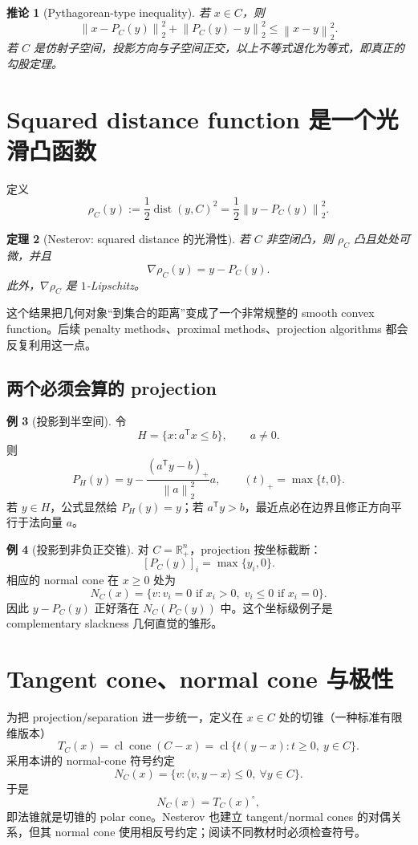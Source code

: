 \documentclass[11pt,a4paper,openany]{ctexrep}
\newtheorem{theorem}{定理}[chapter]
\newtheorem{corollary}[theorem]{推论}
\theoremstyle{definition}
\newtheorem{example}[theorem]{例}
\newcommand{\R}{\mathbb{R}}
\newcommand{\cl}{\operatorname{cl}}
\newcommand{\cone}{\operatorname{cone}}
\newcommand{\dist}{\operatorname{dist}}
\newcommand{\inner}[2]{\langle #1,#2\rangle}
\newcommand{\norm}[1]{\left\lVert #1\right\rVert}
\newcommand{\transpose}{\mathsf{T}}
\begin{document}
\begin{corollary}[Pythagorean-type inequality]
若 $x\in C$，则
\[
\norm{x-P_C(y)}_2^2+\norm{P_C(y)-y}_2^2
\le \norm{x-y}_2^2.
\]
若 $C$ 是仿射子空间，投影方向与子空间正交，以上不等式退化为等式，即真正的勾股定理。
\end{corollary}

\section{Squared distance function 是一个光滑凸函数}
定义
\[
\rho_C(y):=\frac12\dist(y,C)^2
=\frac12\norm{y-P_C(y)}_2^2.
\]

\begin{theorem}[Nesterov: squared distance 的光滑性]
若 $C$ 非空闭凸，则 $\rho_C$ 凸且处处可微，并且
\[
\nabla \rho_C(y)=y-P_C(y).
\]
此外，$\nabla\rho_C$ 是 $1$-Lipschitz。
\end{theorem}
这个结果把几何对象“到集合的距离”变成了一个非常规整的 smooth convex function。后续 penalty methods、proximal methods、projection algorithms 都会反复利用这一点。\cite[\S2.2.3, Lem.~2.2.9]{nesterov}


\subsection{两个必须会算的 projection}
\begin{example}[投影到半空间]
令
\[
H=\{x:a^\transpose x\le b\},\qquad a\ne0.
\]
则
\[
P_H(y)=y-\frac{(a^\transpose y-b)_+}{\norm a_2^2}a,
\qquad (t)_+=\max\{t,0\}.
\]
若 $y\in H$，公式显然给 $P_H(y)=y$；若 $a^\transpose y>b$，最近点必在边界且修正方向平行于法向量 $a$。
\end{example}

\begin{example}[投影到非负正交锥]
对 $C=\R_+^n$，projection 按坐标截断：
\[
[P_C(y)]_i=\max\{y_i,0\}.
\]
相应的 normal cone 在 $x\ge0$ 处为
\[
N_C(x)=\{v: v_i=0\text{ if }x_i>0,\; v_i\le0\text{ if }x_i=0\}.
\]
因此 $y-P_C(y)$ 正好落在 $N_C(P_C(y))$ 中。这个坐标级例子是 complementary slackness 几何直觉的雏形。
\end{example}

\section{Tangent cone、normal cone 与极性}
为把 projection/separation 进一步统一，定义在 $x\in C$ 处的切锥（一种标准有限维版本）
\[
T_C(x)=\cl\cone(C-x)
=\cl\{t(y-x):t\ge0,\ y\in C\}.
\]
采用本讲的 normal-cone 符号约定
\[
N_C(x)=\{v:\inner{v}{y-x}\le0,\ \forall y\in C\}.
\]
于是
\[
\boxed{N_C(x)=T_C(x)^\circ},
\]
即法锥就是切锥的 polar cone。Nesterov 也建立 tangent/normal cones 的对偶关系，但其 normal cone 使用相反号约定；阅读不同教材时必须检查符号。\cite[\S3.1.7]{nesterov}
\end{document}
